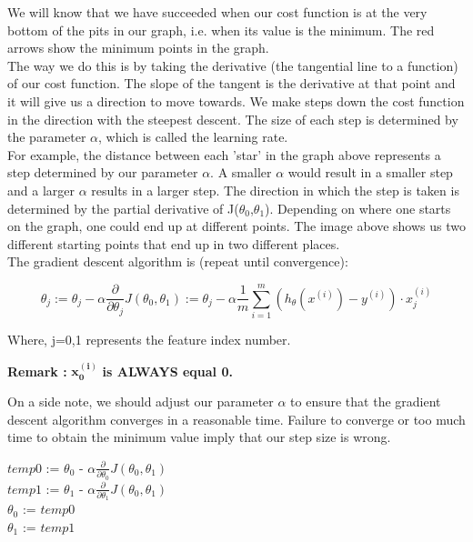 \pagebreak

We will know that we have succeeded when our cost function is at the very bottom of the pits in our graph, i.e. when its value is the minimum. The red arrows show the minimum points in the graph.\\

The way we do this is by taking the derivative (the tangential line to a function) of our cost function. The slope of the tangent is the derivative at that point and it will give us a direction to move towards. We make steps down the cost function in the direction with the steepest descent. The size of each step is determined by the parameter $\alpha$, which is called the learning rate.\\

For example, the distance between each 'star' in the graph above represents a step determined by our parameter $\alpha$. A smaller $\alpha$ would result in a smaller step and a larger $\alpha$ results in a larger step. The direction in which the step is taken is determined by the partial derivative of J($ \theta_0 $,$ \theta_1 $). Depending on where one starts on the graph, one could end up at different points. The image above shows us two different starting points that end up in two different places.\\

The gradient descent algorithm is (repeat until convergence):

\begin{equation}
\theta_j := \theta_j - \alpha \frac{\partial}{\partial \theta_j} J(\theta_0, \theta_1) := \theta_j-\alpha \frac{1}{m} \sum_{i=1}^{m}\left(h_\theta(x^{(i)})-y^{(i)}\right)\cdot x^{(i)}_j
\end{equation}

Where, j=0,1 represents the feature index number.\\

\begin{center}
\textbf{Remark :} $\mathbf{ x^{(i)}_0 }$ \textbf{is ALWAYS equal 0.}\\
\end{center}

On a side note, we should adjust our parameter $ \alpha $ to ensure that the gradient descent algorithm converges in a reasonable time. Failure to converge or too much time to obtain the minimum value imply that our step size is wrong.\\

\begin{tcolorbox}[width=\textwidth,colback={lightgray},title={Correct: Simultaneous update},colbacktitle=lightgray,coltitle=blue]    
	$ temp0$ := $ \theta_0 $ - $\alpha \frac{\partial}{\partial \theta_0} J(\theta_0, \theta_1) $ \\
	$ temp1$ := $ \theta_1 $ - $\alpha \frac{\partial}{\partial \theta_1} J(\theta_0, \theta_1) $\\
	$ \theta_0 $ := $ temp0$\\
	$ \theta_1 $ := $ temp1$
\end{tcolorbox} 



